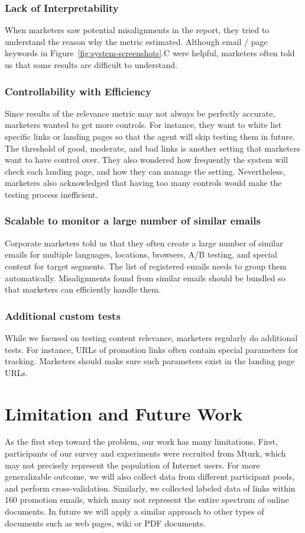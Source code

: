 \documentclass{sigchi}
\begin{document}
\subsubsection{Lack of Interpretability}
When marketers saw potential misalignments in the report, they tried to understand the reason why the metric estimated. Although email / page keywords in Figure~\ref{fig:system-screenshots}.C were helpful, marketers often told us that some results are difficult to understand.      

\subsubsection{Controllability with Efficiency}
Since results of the relevance metric may not always be perfectly accurate, marketers wanted to get more controls. For instance, they want to white list specific links or landing pages so that the agent will skip testing them in future. The threshold of good, moderate, and bad links is another setting that marketers want to have control over. They also wondered how frequently the system will check each landing page, and how they can manage the setting.  
Nevertheless, marketers also acknowledged that having too many controls would make the testing process inefficient.  

\subsubsection{Scalable to monitor a large number of similar emails} 
Corporate marketers told us that they often create a large number of similar emails for multiple languages, locations, browsers, A/B testing, and special content for target segments. The list of registered emails needs to group them automatically. Misalignments found from similar emails should be bundled so that marketers can efficiently handle them.

\subsubsection{Additional custom tests} 
While we focused on testing content relevance, marketers regularly do additional tests. For instance, URLs of promotion links often contain special parameters for tracking. Marketers should make sure such parameters exist in the landing page URLs.    


\section{Limitation and Future Work}
As the first step toward the problem, our work has many limitations. First, participants of our survey and experiments were recruited from Mturk, which may not precisely represent the population of Internet users. For more generalizable outcome, we will also collect data from different participant pools, and perform cross-validation. Similarly, we collected labeled data of links within 160 promotion emails, which many not represent the entire spectrum of online documents. In future we will apply a similar approach to other types of documents such as web pages, wiki or PDF documents. 
\end{document}

